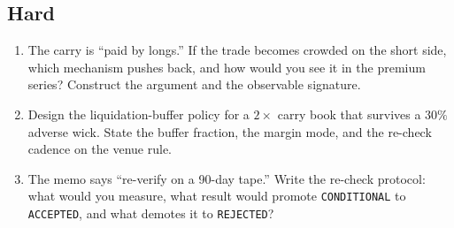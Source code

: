 \subsection*{Hard}
\begin{enumerate}
\item The carry is ``paid by longs.'' If the trade becomes
crowded on the short side, which mechanism pushes back, and how
would you see it in the premium series? Construct the argument
and the observable signature.
\item Design the liquidation-buffer policy for a $2\times$
carry book that survives a $30\%$ adverse wick. State the
buffer fraction, the margin mode, and the re-check cadence on
the venue rule.
\item The memo says ``re-verify on a 90-day tape.'' Write the
re-check protocol: what would you measure, what result would
promote \texttt{CONDITIONAL} to \texttt{ACCEPTED}, and what
demotes it to \texttt{REJECTED}?
\end{enumerate}
